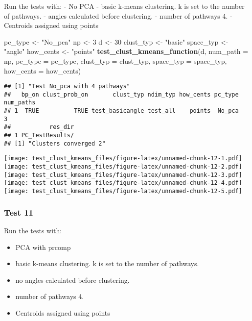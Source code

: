 \documentclass[
]{article}
\newenvironment{Shaded}{\begin{snugshade}}{\end{snugshade}}
\newcommand{\AttributeTok}[1]{\textcolor[rgb]{0.13,0.29,0.53}{#1}}
\newcommand{\DecValTok}[1]{\textcolor[rgb]{0.00,0.00,0.81}{#1}}
\newcommand{\FunctionTok}[1]{\textcolor[rgb]{0.13,0.29,0.53}{\textbf{#1}}}
\newcommand{\NormalTok}[1]{#1}
\newcommand{\OtherTok}[1]{\textcolor[rgb]{0.56,0.35,0.01}{#1}}
\newcommand{\StringTok}[1]{\textcolor[rgb]{0.31,0.60,0.02}{#1}}
\providecommand{\tightlist}{%
  \setlength{\itemsep}{0pt}\setlength{\parskip}{0pt}}
\begin{document}
Run the tests with: - No PCA - basic k-means clustering. k is set to the
number of pathways. - angles calculated before clustering. - number of
pathways 4. - Centroids assigned using points

\begin{Shaded}
\begin{Highlighting}[]
\NormalTok{pc\_type }\OtherTok{\textless{}{-}} \StringTok{"No\_pca"}
\NormalTok{np }\OtherTok{\textless{}{-}} \DecValTok{3}
\NormalTok{d }\OtherTok{\textless{}{-}} \DecValTok{30}
\NormalTok{clust\_typ }\OtherTok{\textless{}{-}} \StringTok{"basic"}
\NormalTok{space\_typ }\OtherTok{\textless{}{-}} \StringTok{"angle"}
\NormalTok{how\_cents }\OtherTok{\textless{}{-}} \StringTok{"points"}
\FunctionTok{test\_clust\_kmeans\_function}\NormalTok{(d,}
                           \AttributeTok{num\_path =}\NormalTok{ np,}
                           \AttributeTok{pc\_type =}\NormalTok{ pc\_type,}
                           \AttributeTok{clust\_typ =}\NormalTok{ clust\_typ,}
                           \AttributeTok{space\_typ =}\NormalTok{ space\_typ,}
                           \AttributeTok{how\_cents =}\NormalTok{ how\_cents)}
\end{Highlighting}
\end{Shaded}

\begin{verbatim}
## [1] "Test No_pca with 4 pathways"
##   bp_on clust_prob_on       clust_typ ndim_typ how_cents pc_type num_paths
## 1  TRUE          TRUE test_basicangle test_all    points  No_pca         3
##           res_dir
## 1 PC_TestResults/
## [1] "Clusters converged 2"
\end{verbatim}

\texttt{[image: test\_clust\_kmeans\_files/figure-latex/unnamed-chunk-12-1.pdf]}
\texttt{[image: test\_clust\_kmeans\_files/figure-latex/unnamed-chunk-12-2.pdf]}
\texttt{[image: test\_clust\_kmeans\_files/figure-latex/unnamed-chunk-12-3.pdf]}
\texttt{[image: test\_clust\_kmeans\_files/figure-latex/unnamed-chunk-12-4.pdf]}
\texttt{[image: test\_clust\_kmeans\_files/figure-latex/unnamed-chunk-12-5.pdf]}

\hypertarget{test-11}{%
\subsubsection{Test 11}\label{test-11}}

Run the tests with:

\begin{itemize}
\tightlist
\item
  PCA with prcomp
\item
  basic k-means clustering. k is set to the number of pathways.
\item
  no angles calculated before clustering.
\item
  number of pathways 4.
\item
  Centroids assigned using points
\end{itemize}
\end{document}
